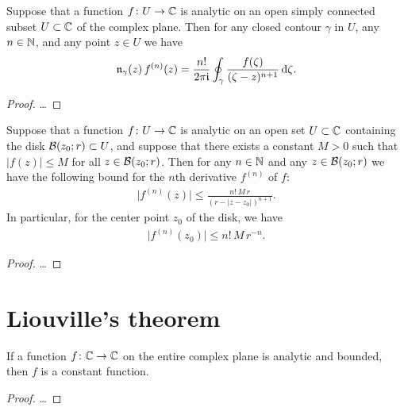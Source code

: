 \begin{theorem}
  \label{thm:cauchy_formula_derivative}
  Suppose that a function $f \colon U \to \bC$ is analytic on an open
  simply connected subset $U \subset \bC$ of the complex plane.
  Then for any closed contour $\gamma$ %
  in $U$, any $n \in \bN$, and any point $z \in U$ we have
  \begin{align*}
    \windN{\gamma}{z} \, f^{(n)}(z)
      = \frac{n!}{2\pi \ii} \oint_\gamma \frac{f(\zeta)}{(\zeta - z)^{n+1}} \, \ud \zeta .
  \end{align*}
\end{theorem}
\begin{proof}
  \ldots
\end{proof}

\begin{lemma}
  \label{lem:cauchy_derivative_estimate}
  Suppose that a function $f \colon U \to \bC$ is analytic on an open
  set $U \subset \bC$ containing the disk $\DiskRC{r}{z_0} \subset U$,
  and suppose that there exists a constant $M>0$ such that
  $|f(z)| \le M$ for all $z \in \DiskRC{r}{z_0}$.
  Then for any $n \in \bN$ and any $z \in \DiskRC{r}{z_0}$ we have
  the following bound for the $n$th derivative $f^{(n)}$ of $f$:
  \begin{align*}
    \big| f^{(n)}(z) \big| \le \frac{n! \, M \, r}{( r - |z-z_0| )^{n+1}} .
  \end{align*}
  In particular, for the center point $z_0$ of the disk, we have
  \begin{align*}
    \big| f^{(n)}(z_0) \big| \le n! \, M \, r^{-n} .
  \end{align*}
\end{lemma}
\begin{proof}
  \ldots
\end{proof}



\section{Liouville's theorem}

\begin{theorem}
  \label{thm:liouville}
  If a function $f \colon \bC \to \bC$ on the entire complex plane
  is analytic and bounded, then $f$ is a constant function.
\end{theorem}
\begin{proof}
  \ldots
\end{proof}



